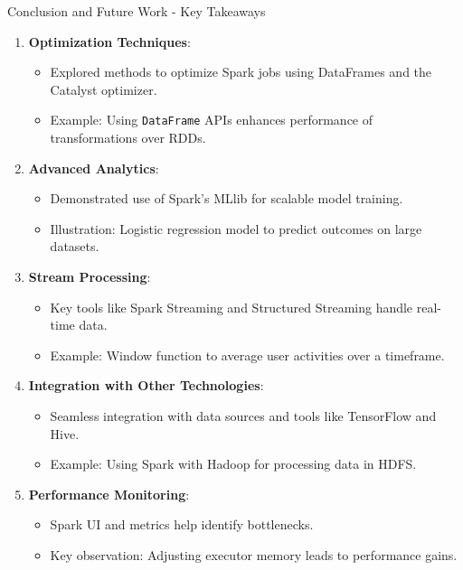 \documentclass[aspectratio=169]{beamer}
\begin{document}
\begin{frame}[fragile]{Conclusion and Future Work - Key Takeaways}
    \begin{enumerate}
        \item \textbf{Optimization Techniques}: 
        \begin{itemize}
            \item Explored methods to optimize Spark jobs using DataFrames and the Catalyst optimizer.
            \item Example: Using \texttt{DataFrame} APIs enhances performance of transformations over RDDs.
        \end{itemize}

        \item \textbf{Advanced Analytics}: 
        \begin{itemize}
            \item Demonstrated use of Spark's MLlib for scalable model training.
            \item Illustration: Logistic regression model to predict outcomes on large datasets.
        \end{itemize}

        \item \textbf{Stream Processing}:
        \begin{itemize}
            \item Key tools like Spark Streaming and Structured Streaming handle real-time data.
            \item Example: Window function to average user activities over a timeframe.
        \end{itemize}

        \item \textbf{Integration with Other Technologies}:
        \begin{itemize}
            \item Seamless integration with data sources and tools like TensorFlow and Hive.
            \item Example: Using Spark with Hadoop for processing data in HDFS.
        \end{itemize}
        
        \item \textbf{Performance Monitoring}:
        \begin{itemize}
            \item Spark UI and metrics help identify bottlenecks.
            \item Key observation: Adjusting executor memory leads to performance gains.
        \end{itemize}
    \end{enumerate}
\end{frame}
\end{document}

